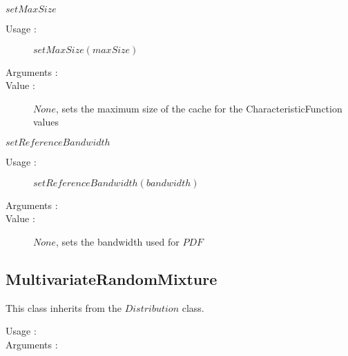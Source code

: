 \begin{description}
\begin{description}
  \item $setMaxSize$
    \begin{description}
    \item[Usage :]  $setMaxSize(maxSize)$
    \item[Arguments :]  \strut
    \item[Value :] $None$, sets the maximum size of the cache for the CharacteristicFunction values
    \end{description}

  \item $setReferenceBandwidth$
    \begin{description}
    \item[Usage :]  $setReferenceBandwidth(bandwidth)$
    \item[Arguments :] \strut
    \item[Value :] $None$, sets the bandwidth used for $PDF$
    \end{description}

  \end{description}

\end{description}

\subsection{MultivariateRandomMixture}
This class inherits from the $Distribution$ class.

\begin{description}
\item[Usage :]  \strut
\item[Arguments :] \strut
\end{description}
